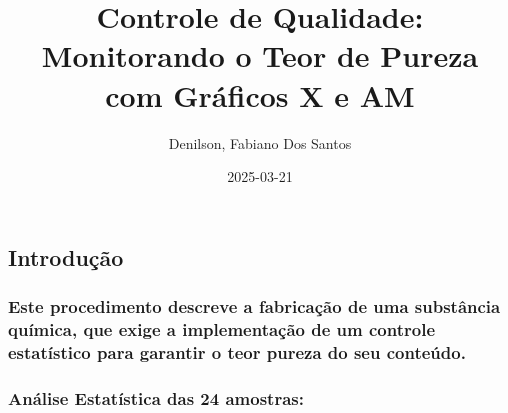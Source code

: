\documentclass[
  letterpaper,
  DIV=11,
  numbers=noendperiod]{scrartcl}
\title{Controle de Qualidade: Monitorando o Teor de Pureza com Gráficos
X e AM}
\author{Denilson, Fabiano Dos Santos}
\date{2025-03-21}
\begin{document}
\maketitle


\subsection{Introdução}\label{introduuxe7uxe3o}

\subsubsection{Este procedimento descreve a fabricação de uma substância
química, que exige a implementação de um controle estatístico para
garantir o teor pureza do seu
conteúdo.}\label{este-procedimento-descreve-a-fabricauxe7uxe3o-de-uma-substuxe2ncia-quuxedmica-que-exige-a-implementauxe7uxe3o-de-um-controle-estatuxedstico-para-garantir-o-teor-pureza-do-seu-conteuxfado.}

\subsubsection{Análise Estatística das 24
amostras:}\label{anuxe1lise-estatuxedstica-das-24-amostras}
\end{document}
